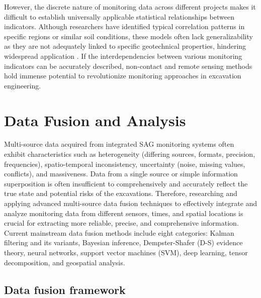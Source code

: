 \documentclass[preprint,11pt,authoryear,3p]{elsarticle}
\begin{document}
However, the discrete nature of monitoring data across different projects makes it difficult to establish universally applicable statistical relationships between indicators. Although researchers have identified typical correlation patterns in specific regions or similar soil conditions, these models often lack generalizability as they are not adequately linked to specific geotechnical properties, hindering widespread application \citep{HARAHAP2020103300}. If the interdependencies between various monitoring indicators can be accurately described, non-contact and remote sensing methods hold immense potential to revolutionize monitoring approaches in excavation engineering.


\section{Data Fusion and Analysis}

Multi-source data acquired from integrated SAG monitoring systems often exhibit characteristics such as heterogeneity (differing sources, formats, precision, frequencies), spatio-temporal inconsistency, uncertainty (noise, missing values, conflicts), and massiveness. Data from a single source or simple information superposition is often insufficient to comprehensively and accurately reflect the true state and potential risks of the excavations. Therefore, researching and applying advanced multi-source data fusion techniques to effectively integrate and analyze monitoring data from different sensors, times, and spatial locations is crucial for extracting more reliable, precise, and comprehensive information\citep{qin_chengzhi_recursive_2025}. Current mainstream data fusion methods include eight categories: Kalman filtering and its variants, Bayesian inference, Dempster-Shafer (D-S) evidence theory, neural networks, support vector machines (SVM), deep learning, tensor decomposition, and geospatial analysis.

\subsection{Data fusion framework}
\end{document}
